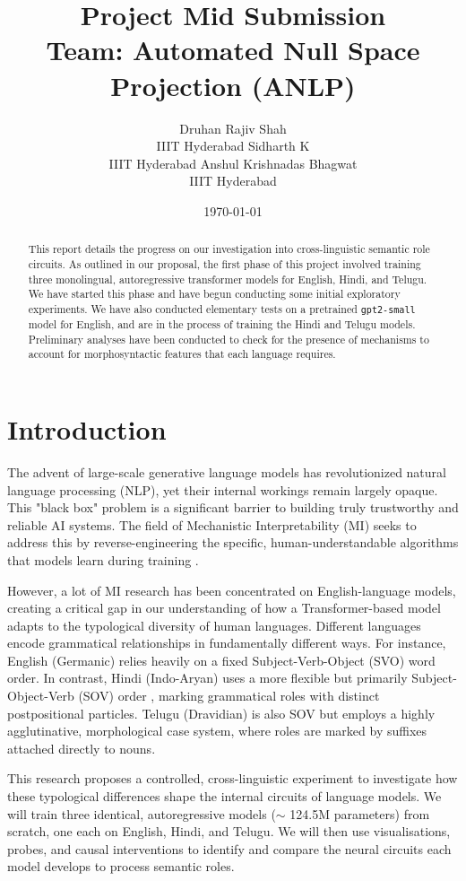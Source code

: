 \documentclass[11pt]{article}
\author{Druhan Rajiv Shah \\ IIIT Hyderabad \And Sidharth K \\ IIIT Hyderabad \And Anshul Krishnadas Bhagwat \\ IIIT Hyderabad}
\date{\today}
\title{Project Mid Submission\\\medskip
\large Team: Automated Null Space Projection (ANLP)}
\begin{document}
\maketitle
\begin{abstract}
This report details the progress on our investigation into cross-linguistic semantic role circuits. As outlined in our proposal, the first phase of this project involved training three monolingual, autoregressive transformer models for English, Hindi, and Telugu. We have started this phase and have begun conducting some initial exploratory experiments. We have also conducted elementary tests on a pretrained \texttt{gpt2-small} model for English, and are in the process of training the Hindi and Telugu models. Preliminary analyses have been conducted to check for the presence of mechanisms to account for morphosyntactic features that each language requires.
\end{abstract}
\section*{Introduction}
\label{sec:org84b0658}

The advent of large-scale generative language models has revolutionized natural language processing (NLP), yet their internal workings remain largely opaque. This "black box" problem is a significant barrier to building truly trustworthy and reliable AI systems. The field of Mechanistic Interpretability (MI) seeks to address this by reverse-engineering the specific, human-understandable algorithms that models learn during training \citep{elhage2021mathematical}.

However, a lot of MI research has been concentrated on English-language models, creating a critical gap in our understanding of how a Transformer-based model adapts to the typological diversity of human languages. Different languages encode grammatical relationships in fundamentally different ways. For instance, English (Germanic) relies heavily on a fixed Subject-Verb-Object (SVO) word order. In contrast, Hindi (Indo-Aryan) uses a more flexible but primarily Subject-Object-Verb (SOV) order \citep{verma1970word}, marking grammatical roles with distinct postpositional particles. Telugu (Dravidian) is also SOV but employs a highly agglutinative, morphological case system, where roles are marked by suffixes attached directly to nouns.

This research proposes a controlled, cross-linguistic experiment to investigate how these typological differences shape the internal circuits of language models. We will train three identical, autoregressive models (\(\sim\) 124.5M parameters) from scratch, one each on English, Hindi, and Telugu. We will then use visualisations, probes, and causal interventions to identify and compare the neural circuits each model develops to process semantic roles.
\end{document}
